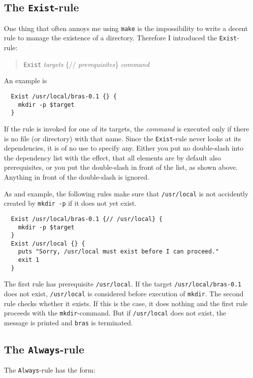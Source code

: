 \documentclass[12pt]{article}
\newcommand{\bras}{\texttt{bras}}
\newcommand{\make}{\texttt{make}}
\begin{document}
\subsection{The \texttt{Exist}-rule}

One thing that often annoys me using \make{} is the impossibility to
write a decent rule to manage the existence of a directory. Therefore
I introduced the \texttt{Exist}-rule:
\begin{quote}
  \texttt{Exist} \textit{targets} \{// \textit{prerequisites}\} \textit{command}
\end{quote}
An example is
\begin{verbatim}
  Exist /usr/local/bras-0.1 {} {
    mkdir -p $target
  }
\end{verbatim}
If the rule is invoked for one of its targets, the \textit{command} is
executed only if there is no file (or directory) with that name.
Since the \texttt{Exist}-rule never looks at its dependencies, it is
of no use to specify any. Either you put no double-slash into the
dependency list with the effect, that all elements are by default also
prerequisites, or you put the double-slash in front of the list, as
shown above. Anything in front of the double-slash is ignored.

As and example, the following rules make sure that
\texttt{/usr/local} is not accidently created by \texttt{mkdir -p} if
it does not yet exist.

\begin{verbatim}
  Exist /usr/local/bras-0.1 {// /usr/local} {
    mkdir -p $target
  }
  Exist /usr/local {} {
    puts "Sorry, /usr/local must exist before I can proceed."
    exit 1
  }	
\end{verbatim}
The first rule has prerequisite \texttt{/usr/local}. If the target
\texttt{/usr/local/bras-0.1}
does not exist, \texttt{/usr/local} is considered
before execution of \texttt{mkdir}. The second rule checks whether it
exists. If this is the case, it does nothing and the first rule
proceeds with the \texttt{mkdir}-command. But if
\texttt{/usr/local} does not exist, the message is printed and \bras{}
is terminated.

\subsection{The \texttt{Always}-rule}

The \texttt{Always}-rule has the form:
\end{document}
